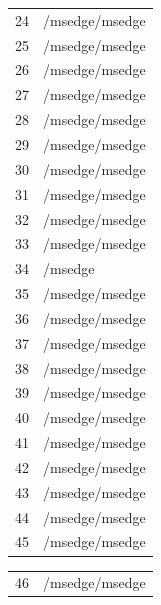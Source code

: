 \documentclass[a4paper,twoside,12pt]{book}
\begin{document}
\begin{appendices}
\begin{table}
\begin{tabular}{ll}
		24  &                                     /msedge/msedge \\
		25  &                                     /msedge/msedge \\
		26  &                                     /msedge/msedge \\
		27  &                                     /msedge/msedge \\
		28  &                                     /msedge/msedge \\
		29  &                                     /msedge/msedge \\
		30  &                                     /msedge/msedge \\
		31  &                                     /msedge/msedge \\
		32  &                                     /msedge/msedge \\
		33  &                                     /msedge/msedge \\
		34  &                                            /msedge \\
		35  &                                     /msedge/msedge \\
		36  &                                     /msedge/msedge \\
		37  &                                     /msedge/msedge \\
		38  &                                     /msedge/msedge \\
		39  &                                     /msedge/msedge \\
		40  &                                     /msedge/msedge \\
		41  &                                     /msedge/msedge \\
		42  &                                     /msedge/msedge \\
		43  &                                     /msedge/msedge \\
		44  &                                     /msedge/msedge \\
		45  &                                     /msedge/msedge \\
		\bottomrule
	\end{tabular}
\end{table}
\begin{table}
	\centering
	\begin{tabular}{ll}
		\toprule
		46  &                                     /msedge/msedge \\

\end{tabular}
\end{table}
\end{appendices}
\end{document}
